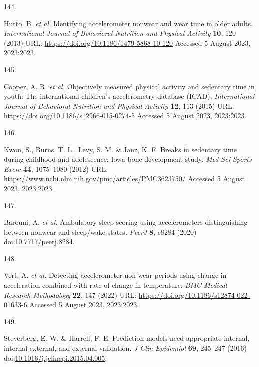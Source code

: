 \documentclass[
  10pt,
]{scrbook}
\newlength{\cslhangindent}
\newlength{\csllabelwidth}
\newlength{\cslentryspacingunit} %
\newenvironment{CSLReferences}[2] %
 {%
  \setlength{\parindent}{0pt}
  \ifodd #1
  \let\oldpar\par
  \def\par{\hangindent=\cslhangindent\oldpar}
  \fi
  \setlength{\parskip}{#2\cslentryspacingunit}
 }%
 {}
\newcommand{\CSLLeftMargin}[1]{\parbox[t]{\csllabelwidth}{#1}}
\newcommand{\CSLRightInline}[1]{\parbox[t]{\linewidth - \csllabelwidth}{#1}\break}
\begin{document}
\begin{CSLReferences}{0}{0}
\leavevmode{}%
\CSLLeftMargin{144. }%
\CSLRightInline{Hutto, B. \emph{et al.} Identifying accelerometer
nonwear and wear time in older adults. \emph{International Journal of
Behavioral Nutrition and Physical Activity} \textbf{10}, 120 (2013) URL:
\url{https://doi.org/10.1186/1479-5868-10-120} Accessed 5 August 2023,
2023:2023.}

\leavevmode{}%
\CSLLeftMargin{145. }%
\CSLRightInline{Cooper, A. R. \emph{et al.} Objectively measured
physical activity and sedentary time in youth: The international
children's accelerometry database ({ICAD}). \emph{International Journal
of Behavioral Nutrition and Physical Activity} \textbf{12}, 113 (2015)
URL: \url{https://doi.org/10.1186/s12966-015-0274-5} Accessed 5 August
2023, 2023:2023.}

\leavevmode{}%
\CSLLeftMargin{146. }%
\CSLRightInline{Kwon, S., Burns, T. L., Levy, S. M. \& Janz, K. F.
Breaks in sedentary time during childhood and adolescence: Iowa bone
development study. \emph{Med Sci Sports Exerc} \textbf{44}, 1075--1080
(2012) URL: \url{https://www.ncbi.nlm.nih.gov/pmc/articles/PMC3623750/}
Accessed 5 August 2023, 2023:2023.}

\leavevmode{}%
\CSLLeftMargin{147. }%
\CSLRightInline{Barouni, A. \emph{et al.} Ambulatory sleep scoring using
accelerometers-distinguishing between nonwear and sleep/wake states.
\emph{{PeerJ}} \textbf{8}, e8284 (2020)
doi:\href{https://doi.org/10.7717/peerj.8284}{10.7717/peerj.8284}.}

\leavevmode{}%
\CSLLeftMargin{148. }%
\CSLRightInline{Vert, A. \emph{et al.} Detecting accelerometer non-wear
periods using change in acceleration combined with rate-of-change in
temperature. \emph{{BMC} Medical Research Methodology} \textbf{22}, 147
(2022) URL: \url{https://doi.org/10.1186/s12874-022-01633-6} Accessed 5
August 2023, 2023:2023.}

\leavevmode{}%
\CSLLeftMargin{149. }%
\CSLRightInline{Steyerberg, E. W. \& Harrell, F. E. Prediction models
need appropriate internal, internal-external, and external validation.
\emph{J Clin Epidemiol} \textbf{69}, 245--247 (2016)
doi:\href{https://doi.org/10.1016/j.jclinepi.2015.04.005}{10.1016/j.jclinepi.2015.04.005}.}


\end{CSLReferences}
\end{document}
